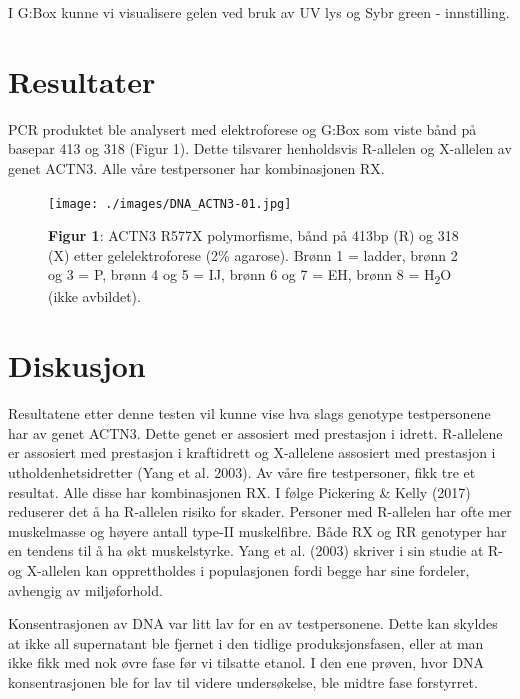 \documentclass[
  letterpaper,
  DIV=11,
  numbers=noendperiod]{scrreprt}
\begin{document}
I G:Box kunne vi visualisere gelen ved bruk av UV lys og Sybr green -
innstilling.

\hypertarget{resultater-1}{%
\section{\texorpdfstring{\textbf{Resultater}}{Resultater}}\label{resultater-1}}

PCR produktet ble analysert med elektroforese og G:Box som viste bånd på
basepar 413 og 318 (Figur 1). Dette tilsvarer henholdsvis R-allelen og
X-allelen av genet ACTN3. Alle våre testpersoner har kombinasjonen RX.

\begin{figure}

\texttt{[image: ./images/DNA\_ACTN3-01.jpg]} \hfill{}

\caption{\textbf{Figur 1}: ACTN3 R577X polymorfisme, bånd på 413bp (R)
og 318 (X) etter gelelektroforese (2\% agarose). Brønn 1 = ladder, brønn
2 og 3 = P, brønn 4 og 5 = IJ, brønn 6 og 7 = EH, brønn 8 =
H\textsubscript{2}O (ikke avbildet).}

\end{figure}

\hypertarget{diskusjon}{%
\section{\texorpdfstring{\textbf{Diskusjon}}{Diskusjon}}\label{diskusjon}}

Resultatene etter denne testen vil kunne vise hva slags genotype
testpersonene har av genet ACTN3. Dette genet er assosiert med
prestasjon i idrett. R-allelene er assosiert med prestasjon i
kraftidrett og X-allelene assosiert med prestasjon i
utholdenhetsidretter (Yang et al. 2003). Av våre fire testpersoner, fikk
tre et resultat. Alle disse har kombinasjonen RX. I følge Pickering \&
Kelly (2017) reduserer det å ha R-allelen risiko for skader. Personer
med R-allelen har ofte mer muskelmasse og høyere antall type-II
muskelfibre. Både RX og RR genotyper har en tendens til å ha økt
muskelstyrke. Yang et al. (2003) skriver i sin studie at R- og X-allelen
kan opprettholdes i populasjonen fordi begge har sine fordeler, avhengig
av miljøforhold.

Konsentrasjonen av DNA var litt lav for en av testpersonene. Dette kan
skyldes at ikke all supernatant ble fjernet i den tidlige
produksjonsfasen, eller at man ikke fikk med nok øvre fase før vi
tilsatte etanol. I den ene prøven, hvor DNA konsentrasjonen ble for lav
til videre undersøkelse, ble midtre fase forstyrret.
\end{document}
